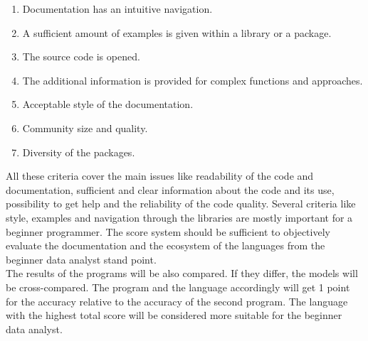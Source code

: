 \documentclass[
  twoside,
  11pt, a4paper,
  footinclude=true,
  headinclude=true,
  cleardoublepage=empty
]{scrreprt}
\begin{document}
    \begin{enumerate}
        \item Documentation has an intuitive navigation.
        \item A sufficient amount of examples is given within a library or a package.
        \item The source code is opened.
        \item The additional information is provided for complex functions and approaches.
        \item Acceptable style of the documentation.
        \item Community size and quality.
        \item Diversity of the packages.
    \end{enumerate}
    All these criteria cover the main issues like readability of the code and documentation, sufficient and clear information about the code and its use, possibility to get help and the reliability of the code quality. Several criteria like style, examples and navigation through the libraries are mostly important for a beginner programmer. The score system should be sufficient to objectively evaluate the documentation and the ecosystem of the languages from the beginner data analyst stand point.\\
    The results of the programs will be also compared. If they differ, the models will be cross-compared. The program and the language accordingly will get 1 point for the accuracy relative to the accuracy of the second program. The language with the highest total score will be considered more suitable for the beginner data analyst.\\
    
\end{document}
